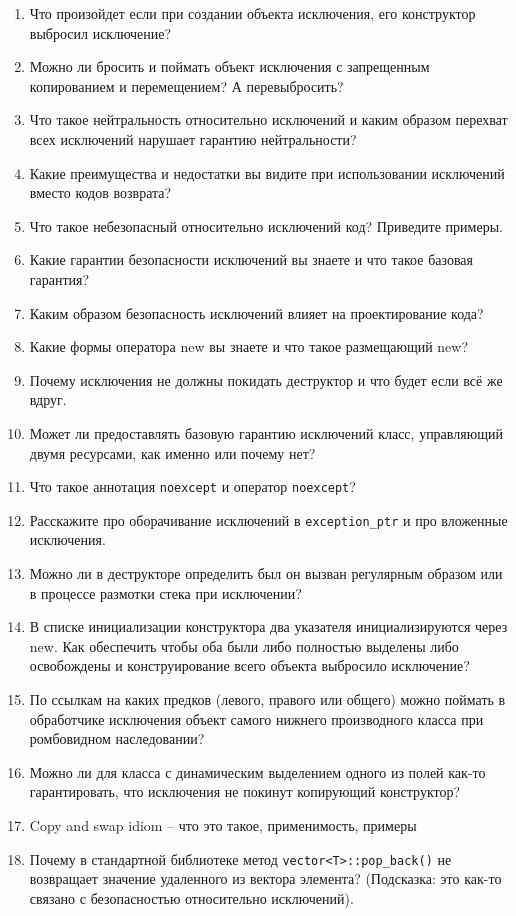 \documentclass[a4paper,12pt,oneside]{article}
\begin{document}
\begin{enumerate}
\item Что произойдет если при создании объекта исключения, его конструктор выбросил исключение?
\item Можно ли бросить и поймать объект исключения с запрещенным копированием и перемещением? А перевыбросить?
\item Что такое нейтральность относительно исключений и каким образом перехват всех исключений нарушает гарантию нейтральности?
\item Какие преимущества и недостатки вы видите при использовании исключений вместо кодов возврата?
\item Что такое небезопасный относительно исключений код? Приведите примеры.
\item Какие гарантии безопасности исключений вы знаете и что такое базовая гарантия?
\item Каким образом безопасность исключений влияет на проектирование кода?
\item Какие формы оператора new вы знаете и что такое размещающий new?
\item Почему исключения не должны покидать деструктор и что будет если всё же вдруг.
\item Может ли предоставлять базовую гарантию исключений класс, управляющий двумя ресурсами, как именно или почему нет?
\item Что такое аннотация \lstinline!noexcept! и оператор \lstinline!noexcept!?
\item Расскажите про оборачивание исключений в \lstinline!exception_ptr! и про вложенные исключения.
\item Можно ли в деструкторе определить был он вызван регулярным образом или в процессе размотки стека при исключении?
\item В списке инициализации конструктора два указателя инициализируются через new. Как обеспечить чтобы оба были либо полностью выделены либо освобождены и конструирование всего объекта выбросило исключение?
\item По ссылкам на каких предков (левого, правого или общего) можно поймать в обработчике исключения объект самого нижнего производного класса при ромбовидном наследовании?
\item Можно ли для класса с динамическим выделением одного из полей как-то гарантировать, что исключения не покинут копирующий конструктор?
\item Copy and swap idiom -- что это такое, применимость, примеры
\item Почему в стандартной библиотеке метод \lstinline!vector<T>::pop_back()! не возвращает значение удаленного из вектора элемента? (Подсказка: это как-то связано с безопасностью относительно исключений).

\end{enumerate}
\end{document}
